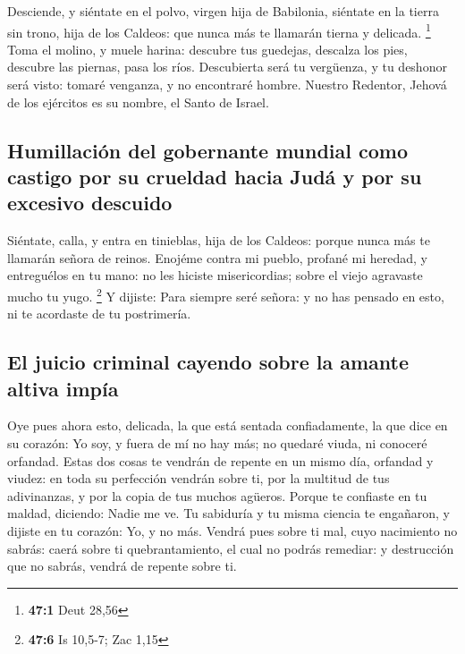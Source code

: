  Desciende, y siéntate en el polvo, virgen hija de
Babilonia, siéntate en la tierra sin trono, hija de los Caldeos: que
nunca más te llamarán tierna y delicada. \footnote{\textbf{47:1} Deut
  28,56}  Toma el molino, y muele harina: descubre tus
guedejas, descalza los pies, descubre las piernas, pasa los ríos.
 Descubierta será tu vergüenza, y tu deshonor será visto:
tomaré venganza, y no encontraré hombre.  Nuestro Redentor,
Jehová de los ejércitos es su nombre, el Santo de Israel.

\hypertarget{humillaciuxf3n-del-gobernante-mundial-como-castigo-por-su-crueldad-hacia-juduxe1-y-por-su-excesivo-descuido}{%
\subsection{Humillación del gobernante mundial como castigo por su
crueldad hacia Judá y por su excesivo
descuido}\label{humillaciuxf3n-del-gobernante-mundial-como-castigo-por-su-crueldad-hacia-juduxe1-y-por-su-excesivo-descuido}}

 Siéntate, calla, y entra en tinieblas, hija de los Caldeos:
porque nunca más te llamarán señora de reinos.  Enojéme
contra mi pueblo, profané mi heredad, y entreguélos en tu mano: no les
hiciste misericordias; sobre el viejo agravaste mucho tu yugo.
\footnote{\textbf{47:6} Is 10,5-7; Zac 1,15}  Y dijiste:
Para siempre seré señora: y no has pensado en esto, ni te acordaste de
tu postrimería.

\hypertarget{el-juicio-criminal-cayendo-sobre-la-amante-altiva-impuxeda}{%
\subsection{El juicio criminal cayendo sobre la amante altiva
impía}\label{el-juicio-criminal-cayendo-sobre-la-amante-altiva-impuxeda}}

 Oye pues ahora esto, delicada, la que está sentada
confiadamente, la que dice en su corazón: Yo soy, y fuera de mí no hay
más; no quedaré viuda, ni conoceré orfandad.  Estas dos
cosas te vendrán de repente en un mismo día, orfandad y viudez: en toda
su perfección vendrán sobre ti, por la multitud de tus adivinanzas, y
por la copia de tus muchos agüeros.  Porque te confiaste en
tu maldad, diciendo: Nadie me ve. Tu sabiduría y tu misma ciencia te
engañaron, y dijiste en tu corazón: Yo, y no más.  Vendrá
pues sobre ti mal, cuyo nacimiento no sabrás: caerá sobre ti
quebrantamiento, el cual no podrás remediar: y destrucción que no
sabrás, vendrá de repente sobre ti.

